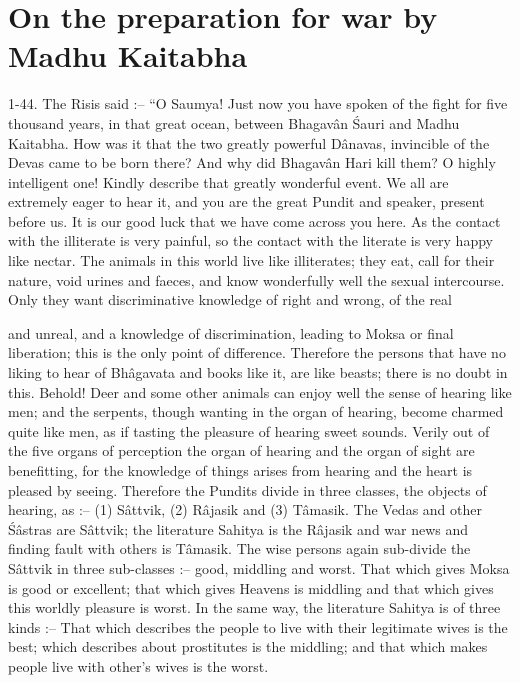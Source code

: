 \chapter{On the preparation for war by Madhu Kaitabha}

1-44. The Risis said :-- ``O Saumya! Just now you have spoken of the fight for five thousand years, in that great ocean, between Bhagav\^an \'Sauri and Madhu Kaitabha. How was it that the two greatly powerful D\^anavas, invincible of the Devas came to be born there? And why did Bhagav\^an Hari kill them? O highly intelligent one! Kindly describe that greatly wonderful event. We all are extremely eager to hear it, and you are the great Pundit and speaker, present before us. It is our good luck that we have come across you here. As the contact with the illiterate is very painful, so the contact with the literate is very happy like nectar. The animals in this world live like illiterates; they eat, call for their nature, void urines and faeces, and know wonderfully well the sexual intercourse. Only they want discriminative knowledge of right and wrong, of the real

and unreal, and a knowledge of discrimination, leading to Moksa or final liberation; this is the only point of difference. Therefore the persons that have no liking to hear of Bh\^agavata and books like it, are like beasts; there is no doubt in this. Behold! Deer and some other animals can enjoy well the sense of hearing like men; and the serpents, though wanting in the organ of hearing, become charmed quite like men, as if tasting the pleasure of hearing sweet sounds. Verily out of the five organs of perception the organ of hearing and the organ of sight are benefitting, for the knowledge of things arises from hearing and the heart is pleased by seeing. Therefore the Pundits divide in three classes, the objects of hearing, as :-- (1) S\^attvik, (2) R\^ajasik and (3) T\^amasik. The Vedas and other \'S\^astras are S\^attvik; the literature Sahitya is the R\^ajasik and war news and finding fault with others is T\^amasik. The wise persons again sub-divide the S\^attvik in three sub-classes :-- good, middling and worst. That which gives Moksa is good or excellent; that which gives Heavens is middling and that which gives this worldly pleasure is worst. In the same way, the literature Sahitya is of three kinds :-- That which describes the people to live with their legitimate wives is the best; which describes about prostitutes is the middling; and that which makes people live with other's wives is the worst.

